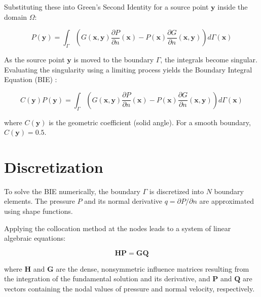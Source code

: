 Substituting these into Green's Second Identity for a source point $\mathbf{y}$ inside the domain $\Omega$:

\begin{equation}
    P(\mathbf{y}) = \int_{\Gamma} \left( G(\mathbf{x}, \mathbf{y}) \frac{\partial P}{\partial n}(\mathbf{x}) - P(\mathbf{x}) \frac{\partial G}{\partial n}(\mathbf{x}, \mathbf{y}) \right) d\Gamma(\mathbf{x})
\end{equation}

As the source point $\mathbf{y}$ is moved to the boundary $\Gamma$, the integrals become singular. Evaluating the singularity using a limiting process yields the Boundary Integral Equation (BIE) \cite{marburg2002boundary}:

\begin{equation}
    C(\mathbf{y}) P(\mathbf{y}) = \int_{\Gamma} \left( G(\mathbf{x}, \mathbf{y}) \frac{\partial P}{\partial n}(\mathbf{x}) - P(\mathbf{x}) \frac{\partial G}{\partial n}(\mathbf{x}, \mathbf{y}) \right) d\Gamma(\mathbf{x})
\end{equation}

where $C(\mathbf{y})$ is the geometric coefficient (solid angle). For a smooth boundary, $C(\mathbf{y}) = 0.5$.

\section{Discretization}

To solve the BIE numerically, the boundary $\Gamma$ is discretized into $N$ boundary elements. The pressure $P$ and its normal derivative $q = \partial P / \partial n$ are approximated using shape functions. 

Applying the collocation method at the nodes leads to a system of linear algebraic equations:

\begin{equation}
    \mathbf{H} \mathbf{P} = \mathbf{G} \mathbf{Q}
\end{equation}

where $\mathbf{H}$ and $\mathbf{G}$ are the dense, nonsymmetric influence matrices resulting from the integration of the fundamental solution and its derivative, and $\mathbf{P}$ and $\mathbf{Q}$ are vectors containing the nodal values of pressure and normal velocity, respectively.

